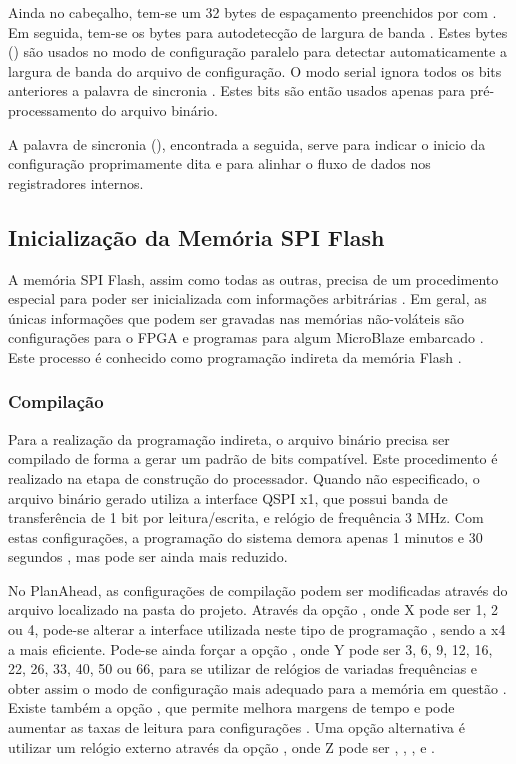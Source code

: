 \documentclass[11pt,a4paper,oneside]{book}
\begin{document}
Ainda no cabeçalho, tem-se um 32 bytes de espaçamento preenchidos por com .
Em seguida, tem-se os bytes para autodetecção de largura de banda \cite{ug470, xapp583}.
Estes bytes () são usados no modo de configuração paralelo para detectar automaticamente a largura de banda do arquivo de configuração.
O modo serial ignora todos os bits anteriores a palavra de sincronia \cite{xapp583}.
Estes bits são então usados apenas para pré-processamento do arquivo binário.

A palavra de sincronia (), encontrada a seguida, serve para indicar o inicio da configuração proprimamente dita e para alinhar o fluxo de dados nos registradores internos.

\subsection{Inicialização da Memória SPI Flash}
\label{sec:flash_indireta}
A memória SPI Flash, assim como todas as outras, precisa de um procedimento especial para poder ser inicializada com informações arbitrárias \cite{xapp694}.
Em geral, as únicas informações que podem ser gravadas nas memórias não-voláteis são configurações para o FPGA e programas para algum MicroBlaze embarcado \cite{ug111}.
Este processo é conhecido como programação indireta da memória Flash \cite{xapp586}.

\subsubsection{Compilação} Para a realização da programação indireta, o arquivo binário precisa ser compilado de forma a gerar um padrão de bits compatível.
Este procedimento é realizado na etapa de construção do processador.
Quando não especificado, o arquivo binário gerado utiliza a interface QSPI x1, que possui banda de transferência de 1 bit por leitura/escrita,  e relógio de frequência 3 MHz.
Com estas configurações, a programação do sistema demora apenas 1 minutos e 30 segundos \cite{xapp586}, mas pode ser ainda mais reduzido.

No PlanAhead, as configurações de compilação podem ser modificadas através do arquivo  localizado na pasta  do projeto.
Através da opção , onde X pode ser 1, 2 ou 4, pode-se alterar a interface utilizada neste tipo de programação \cite{ug628, xapp576}, sendo a x4 a mais eficiente.
Pode-se ainda forçar a opção , onde Y pode ser 3, 6, 9, 12, 16, 22, 26, 33, 40, 50 ou 66, para se utilizar de relógios de variadas frequências e obter assim o modo de configuração mais adequado para a memória em questão \cite{xapp586, ug628, ug810}.
Existe também a opção , que permite melhora margens de tempo e pode aumentar as taxas de leitura para configurações \cite{ug628, ug586}.
Uma opção alternativa é utilizar um relógio externo através da opção , onde Z pode ser , , ,  e .
\end{document}

